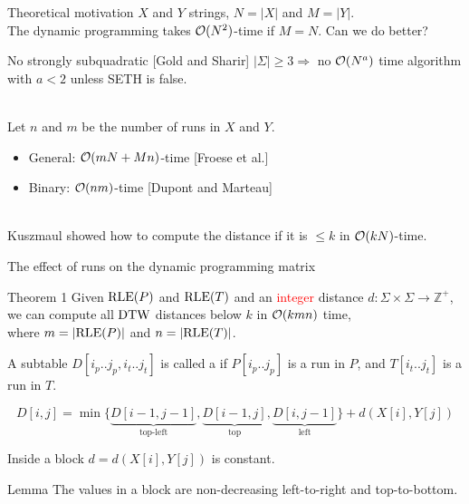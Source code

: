 \begin{frame}{Theoretical motivation}
$X$ and $Y$ strings, $N=|X|$ and $M=|Y|$.\\
The dynamic programming takes $\mathcal{O}(N^2)$-time if $M=N$. Can we do better?\pause
\begin{block}{No strongly subquadratic [Gold and Sharir]}
$|\Sigma| \geq 3 \Rightarrow $ no $\mathcal{O}(N^{a})$ time algorithm with $a<2$ unless SETH is false.
\end{block}\pause

\\
Let $n$ and $m$ be the number of runs in $X$ and $Y$. \pause
\begin{itemize}
\item General: $\mathcal{O}(mN+Mn)$-time [Froese et al.] \pause
\item Binary: $\mathcal{O}(nm)$-time [Dupont and Marteau] \pause
\end{itemize} \hfill

\\
Kuszmaul showed how to compute the distance if it is $\leq k$ in $\mathcal{O}(kN)$-time.
\end{frame}

\begin{frame}{The effect of runs on the dynamic programming matrix}
\begin{myalertblock}{Theorem 1}
Given $\mathrm{RLE}(P)$ and $\mathrm{RLE}(T)$ and an \textcolor{red}{integer} distance $d: \Sigma \times \Sigma \rightarrow \mathbb{Z}^+$,\\ we can compute all $\mathrm{DTW}$ distances below $k$ in $\mathcal{O}(k mn)$ time,\\ where $m=|\mathrm{RLE}(P)|$ and $n=|\mathrm{RLE}(T)|$.
\end{myalertblock}\pause

A subtable $D[i_p .. j_p, i_t .. j_t]$ is called a  if $P[i_p.. j_p]$ is a run in $P$, and $T[i_t .. j_t]$ is a run in $T$.


%

\[
D[i,j] = {\min\{
\underbrace{D[i-1,j-1]}_\text{top-left},
\underbrace{D[i-1,j]}_\text{top},
\underbrace{D[i,j-1]}_\text{left}
\}+ d(X[i], Y[j])
}
\]

Inside a block $d=d(X[i], Y[j])$ is constant.\\ \pause


\begin{block}{Lemma}
\label{lm:non-decreasing}
The values in a block are non-decreasing left-to-right and top-to-bottom.
\end{block}\pause


\end{frame}